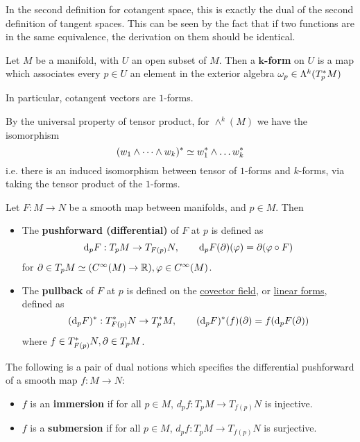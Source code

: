 \documentclass{article}
\begin{document}
\begin{remark}
    In the second definition for cotangent space, this is exactly the dual of the second definition of tangent spaces. This can be seen by the fact that if two functions are in the same equivalence, the derivation on them should be identical.
\end{remark}

\begin{definition}
    Let $M$ be a manifold, with $U$ an open subset of $M$. Then a \textbf{$\bm{k}$-form} on $U$ is a map which associates every $p \in U$ an element in the exterior algebra $\omega_p \in \Lambda^k(T_p^{\ast} M)$
\end{definition}

\begin{remark}
    In particular, cotangent vectors are $1$-forms.
\end{remark}

\begin{remark}
    By the universal property of tensor product, for $\wedge^k(M)$ we have the isomorphism
    \[
        (w_1 \wedge \dots \wedge w_k)^{\ast} \simeq w_1^{\ast} \wedge \dots w_k^{\ast}
    \]
    i.e. there is an induced isomorphism between tensor of $1$-forms and $k$-forms, via taking the tensor product of the $1$-forms.
\end{remark}

\begin{definition}
    Let $F: M \to N$ be a smooth map between manifolds, and $p \in M$. Then
    \begin{itemize}
        \item The \textbf{pushforward (differential)} of $F$ at $p$ is defined as
        \[
            \mathrm{d}_p F: T_p M \to T_{F(p)} N, \qquad \mathrm{d}_p F (\partial) (\varphi) = \partial(\varphi \circ F)
        \]
        for $\partial \in T_p M \simeq (C^{\infty}(M) \to \mathbb{R}), \varphi \in C^{\infty}(M)$.
        \item The \textbf{pullback} of $F$ at $p$ is defined on the \underline{covector field}, or \underline{linear forms}, defined as 
        \[
            (\mathrm{d}_p F)^{\ast}: T_{F(p)}^{\ast}N \to T_p^{\ast} M, \qquad (\mathrm{d}_p F)^{\ast}(f)(\partial) = f(\mathrm{d}_p F(\partial))
        \]
        where $f \in T_{F(p)}^{\ast} N, \partial \in T_p M$.
    \end{itemize}
\end{definition}

\begin{definition}
    The following is a pair of dual notions which specifies the differential pushforward of a smooth map $f: M \to N$:
    \begin{itemize}
        \item $f$ is an \textbf{immersion} if for all $p \in M$, $d_p f : T_p  M \to T_{f(p)} N$ is injective.
        \item $f$ is a \textbf{submersion} if for all $p \in M$, $d_p f : T_p  M \to T_{f(p)} N$ is surjective.
    \end{itemize}
\end{definition}
\end{document}
